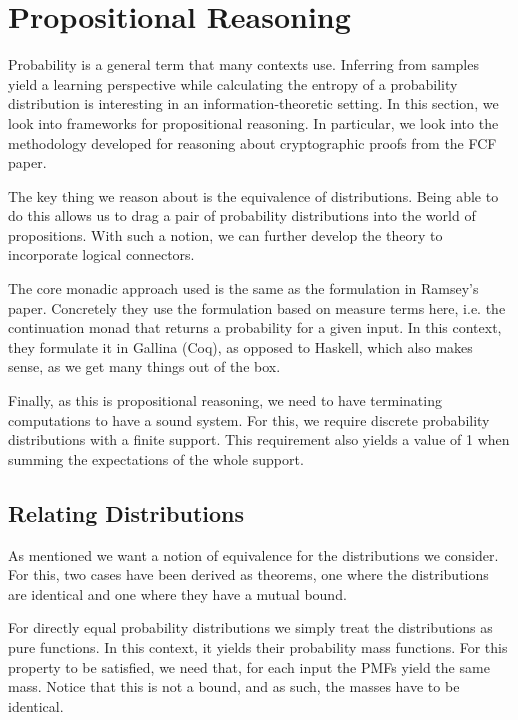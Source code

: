 \section{Propositional Reasoning}
Probability is a general term that many contexts use. Inferring
from samples yield a learning perspective while calculating the entropy of a
probability distribution is interesting in an information-theoretic setting. In this section,
we look into frameworks for propositional reasoning. In particular, we look
into the methodology developed for reasoning about cryptographic proofs
from the FCF paper\cite{Petcher:2015}.

The key thing we reason about is the equivalence of distributions. Being able to
do this allows us to drag a pair of probability distributions into the world
of propositions. With such a notion, we can further develop the theory to
incorporate logical connectors.

The core monadic approach used is the same as the formulation in Ramsey's
paper. Concretely they use the formulation based on measure terms here, i.e.
the continuation monad that returns a probability for a given input. In this
context, they formulate it in Gallina (Coq), as opposed to Haskell, which also 
makes sense, as we get many things out of the box.

Finally, as this is propositional reasoning, we need to have terminating
computations to have a sound system. For this, we require discrete probability
distributions with a finite support. This requirement also yields a value of 1 when summing
the expectations of the whole support.

\subsection{Relating Distributions}
As mentioned we want a notion of equivalence for the distributions we consider.
For this, two cases have been derived as theorems, one where the distributions
are identical and one where they have a mutual bound.

For directly equal probability distributions we simply treat the distributions as pure
functions. In this context, it yields their probability mass functions. For this
property to be satisfied, we need that, for each input the PMFs yield
the same mass. Notice that this is not a bound, and as such,
the masses have to be identical.

